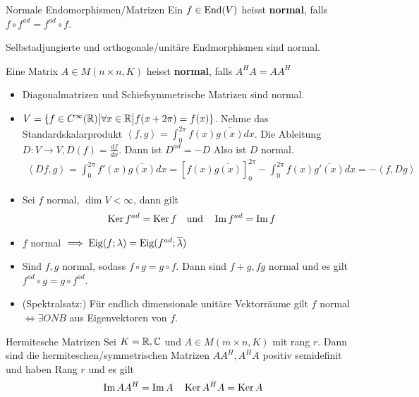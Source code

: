 \begin{definition}{Normale Endomorphismen/Matrizen}
    Ein $f \in \operatorname{End}(V)$ heisst \textbf{normal}, falls $f \circ f^{ad} = f^{ad} \circ f$.

    Selbstadjungierte und orthogonale/unitäre Endmorphismen sind normal.

    Eine Matrix $A \in M(n\times n,K)$ heisst \textbf{normal}, falls $A^HA = AA^H$
\end{definition}
\begin{itemize}
    \item   Diagonalmatrizen und Schiefsymmetrische Matrizen sind normal.
    \item   $V = \{f \in C^\infty(\mathbb{R}) \big\vert \forall x \in \mathbb{R} \big\vert f(x + 2\pi) = f(x)\}$. Nehme das Standardskalarprodukt $\left<f,g\right> = \int_{0}^{2\pi} f(x) \overline{g(x)} dx$.  Die Ableitung $D: V \to V, D(f) = \frac{df}{dx}$. Dann ist $D^{ad} = -D$ Also ist $D$ normal.
    \begin{align*}
        \left<Df,g\right> = \int_{0}^{2\pi} f'(x)\overline{g(x)}dx = [f(x) \overline{g(x)}]_{0}^{2\pi} - \int_{0}^{2\pi} f(x) \overline{g'(x)}dx = -\left<f,Dg\right>
    \end{align*}
    \item   Sei $f$ normal, $\dim V < \infty$, dann gilt
    \begin{align*}
        \operatorname{Ker} f^{ad} = \operatorname{Ker} f \quad \text{und} \quad \operatorname{Im} f^{ad} = \operatorname{Im} f
    \end{align*}
    \item   $f$ normal $\implies \operatorname{Eig}(f;\lambda) = \operatorname{Eig}(f^{ad};\overline{\lambda})$
    \item   Sind $f,g$ normal, sodass $f \circ g = g \circ f$. Dann sind $f + g, fg$ normal und es gilt $f^{ad} \circ g = g \circ f^{ad}$.
    \item   (Spektralsatz:) Für endlich dimensionale unitäre Vektorräume gilt 
    $f$ normal $\Leftrightarrow \exists ONB$ aus Eigenvektoren von $f$.
\end{itemize}





\begin{lemma}{Hermitesche Matrizen}
    Sei $K = \mathbb{R}, \mathbb{C}$ und $A \in M(m\times n,K)$ mit rang $r$. Dann sind die hermiteschen/symmetrischen Matrizen $AA^H, A^HA$ positiv semidefinit und haben Rang $r$ und es gilt
    \begin{align*}
        \operatorname{Im} AA^H = \operatorname{Im} A \quad \operatorname{Ker} A^HA = \operatorname{Ker} A
    \end{align*}
\end{lemma}

